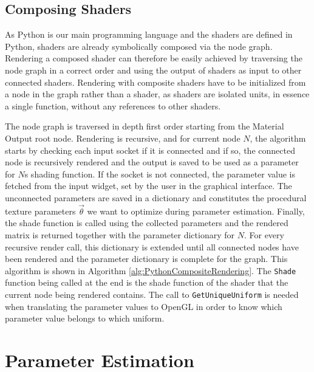 \subsection{Composing Shaders}

As Python is our main programming language and the shaders are defined in Python, shaders are already symbolically composed via the node graph. Rendering a composed shader can therefore be easily achieved by traversing the node graph in a correct order and using the output of shaders as input to other connected shaders. Rendering with composite shaders have to be initialized from a node in the graph rather than a shader, as shaders are isolated units, in essence a single function, without any references to other shaders.

The node graph is traversed in depth first order starting from the Material Output root node. Rendering is recursive, and for current node $N$, the algorithm starts by checking each input socket if it is connected and if so, the connected node is recursively rendered and the output is saved to be used as a parameter for $N$s shading function. If the socket is not connected, the parameter value is fetched from the input widget, set by the user in the graphical interface. The unconnected parameters are saved in a dictionary and constitutes the procedural texture parameters $\vec{\theta}$ we want to optimize during parameter estimation. Finally, the shade function is called using the collected parameters and the rendered matrix is returned together with the parameter dictionary for $N$. For every recursive render call, this dictionary is extended until all connected nodes have been rendered and the parameter dictionary is complete for the graph. This algorithm is shown in Algorithm \ref{alg:PythonCompositeRendering}. The \texttt{Shade} function being called at the end is the shade function of the shader that the current node being rendered contains. The call to \texttt{GetUniqueUniform} is needed when translating the parameter values to OpenGL in order to know which parameter value belongs to which uniform.



\section{Parameter Estimation}

